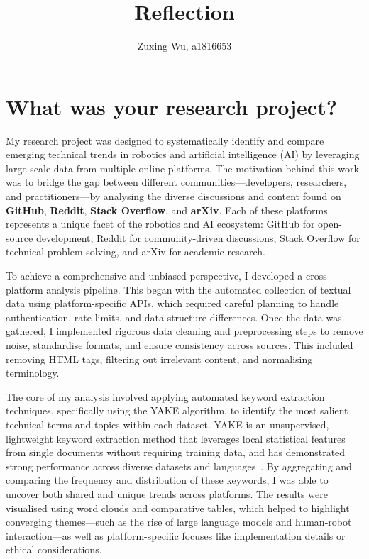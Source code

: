 \documentclass[sigconf, nonacm]{acmart}
\begin{document}
\justifying

\title{Reflection}

\author{Zuxing Wu, a1816653}

\maketitle

\section{What was your research project?}
My research project was designed to systematically identify and compare emerging technical trends in robotics and artificial intelligence (AI) by leveraging large-scale data from multiple online platforms. The motivation behind this work was to bridge the gap between different communities—developers, researchers, and practitioners—by analysing the diverse discussions and content found on \textbf{GitHub}, \textbf{Reddit}, \textbf{Stack Overflow}, and \textbf{arXiv}. Each of these platforms represents a unique facet of the robotics and AI ecosystem: GitHub for open-source development, Reddit for community-driven discussions, Stack Overflow for technical problem-solving, and arXiv for academic research.

To achieve a comprehensive and unbiased perspective, I developed a cross-platform analysis pipeline. This began with the automated collection of textual data using platform-specific APIs, which required careful planning to handle authentication, rate limits, and data structure differences. Once the data was gathered, I implemented rigorous data cleaning and preprocessing steps to remove noise, standardise formats, and ensure consistency across sources. This included removing HTML tags, filtering out irrelevant content, and normalising terminology.

The core of my analysis involved applying automated keyword extraction techniques, specifically using the YAKE algorithm, to identify the most salient technical terms and topics within each dataset. YAKE is an unsupervised, lightweight keyword extraction method that leverages local statistical features from single documents without requiring training data, and has demonstrated strong performance across diverse datasets and languages~\cite{CamposRicardo2020YKef}. By aggregating and comparing the frequency and distribution of these keywords, I was able to uncover both shared and unique trends across platforms. The results were visualised using word clouds and comparative tables, which helped to highlight converging themes—such as the rise of large language models and human-robot interaction—as well as platform-specific focuses like implementation details or ethical considerations.
\end{document}
